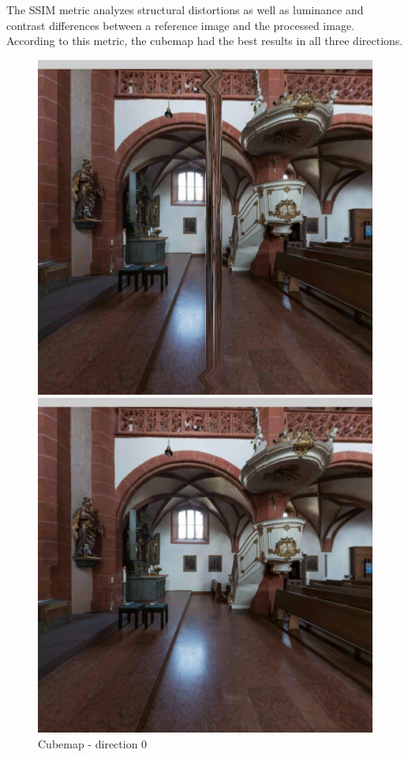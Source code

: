 \documentclass[12pt]{article}
\begin{document}
The SSIM metric analyzes structural distortions as well as luminance and contrast differences between a reference image and the processed image. According to this metric, the cubemap had the best results in all three directions.

\begin{figure}[H]
  \centering
  \begin{minipage}[b]{0.3\textwidth}
    \includegraphics[width=1\textwidth]{../images/screenshots/Screenshot_0_Equi2Cube.jpg}
    \caption{Cubemap - direction 0}
    \label{fig:cubemap_direction_0}
  \end{minipage}
  \hfill
  \begin{minipage}[b]{0.3\textwidth}
    \centering
    \includegraphics[width=1\textwidth]{../images/screenshots/Screenshot_0_Skybox.jpg}

\end{minipage}
\end{figure}
\end{document}
